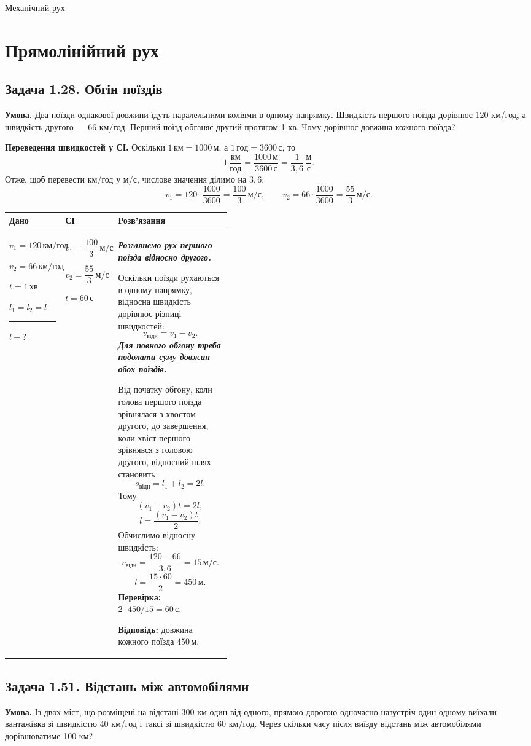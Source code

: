 \documentclass[12pt,a4paper]{article}
\newenvironment{solutiontable}{\small\begin{tabular}{|>{\raggedright\arraybackslash}p{0.22\linewidth}|>{\raggedright\arraybackslash}p{0.20\linewidth}|>{\raggedright\arraybackslash}p{\dimexpr0.58\linewidth-6\tabcolsep-4\arrayrulewidth\relax}|}\hline
\textbf{Дано}&\textbf{СІ}&\textbf{Розв'язання}\\\hline}{\\\hline\end{tabular}\par}
\newcommand{\target}[1]{\par\rule{\linewidth}{0.3pt}\par $#1-?$}
\newcommand{\why}[1]{\textbf{\textit{#1}}\par}
\begin{document}
\begin{center}{\LARGE Механічний рух}\end{center}
\section*{Прямолінійний рух}
\subsection*{Задача 1.28. Обгін поїздів}
\textbf{Умова.} Два поїзди однакової довжини їдуть паралельними коліями в одному напрямку. Швидкість першого поїзда дорівнює 120 км/год, а швидкість другого --- 66 км/год. Перший поїзд обганяє другий протягом 1 хв. Чому дорівнює довжина кожного поїзда?

\textbf{Переведення швидкостей у СІ.} Оскільки $1\,\text{км}=1000\,\text{м}$, а $1\,\text{год}=3600\,\text{с}$, то
\[
1\,\frac{\text{км}}{\text{год}}=\frac{1000\,\text{м}}{3600\,\text{с}}=\frac{1}{3{,}6}\,\frac{\text{м}}{\text{с}}.
\]
Отже, щоб перевести км/год у м/с, числове значення ділимо на $3{,}6$:
\[
v_1=120\cdot\frac{1000}{3600}=\frac{100}{3}\,\text{м/с},\qquad
v_2=66\cdot\frac{1000}{3600}=\frac{55}{3}\,\text{м/с}.
\]
\begin{solutiontable}
$v_1=120\,\text{км/год}$\par
$v_2=66\,\text{км/год}$\par
$t=1\,\text{хв}$\par
$l_1=l_2=l$
\target{l}
&
$v_1=\dfrac{100}{3}\,\text{м/с}$\par
$v_2=\dfrac{55}{3}\,\text{м/с}$\par
$t=60\,\text{с}$
&
\why{Розглянемо рух першого поїзда відносно другого.}
Оскільки поїзди рухаються в одному напрямку, відносна швидкість дорівнює різниці швидкостей:
\[v_{\text{відн}}=v_1-v_2.\]
\why{Для повного обгону треба подолати суму довжин обох поїздів.}
Від початку обгону, коли голова першого поїзда зрівнялася з хвостом другого, до завершення, коли хвіст першого зрівнявся з головою другого, відносний шлях становить
\[s_{\text{відн}}=l_1+l_2=2l.\]
Тому
\[(v_1-v_2)t=2l,\]
\[l=\frac{(v_1-v_2)t}{2}.\]
Обчислимо відносну швидкість:
\[v_{\text{відн}}=\frac{120-66}{3{,}6}=15\,\text{м/с}.\]
\[l=\frac{15\cdot60}{2}=450\,\text{м}.\]
\textbf{Перевірка:} $2\cdot450/15=60\,\text{с}$.
\par\textbf{Відповідь:} довжина кожного поїзда $450\,\text{м}$.
\end{solutiontable}
\newpage
\subsection*{Задача 1.51. Відстань між автомобілями}
\textbf{Умова.} Із двох міст, що розміщені на відстані 300 км один від одного, прямою дорогою одночасно назустріч один одному виїхали вантажівка зі швидкістю 40 км/год і таксі зі швидкістю 60 км/год. Через скільки часу після виїзду відстань між автомобілями дорівнюватиме 100 км?
\end{document}
